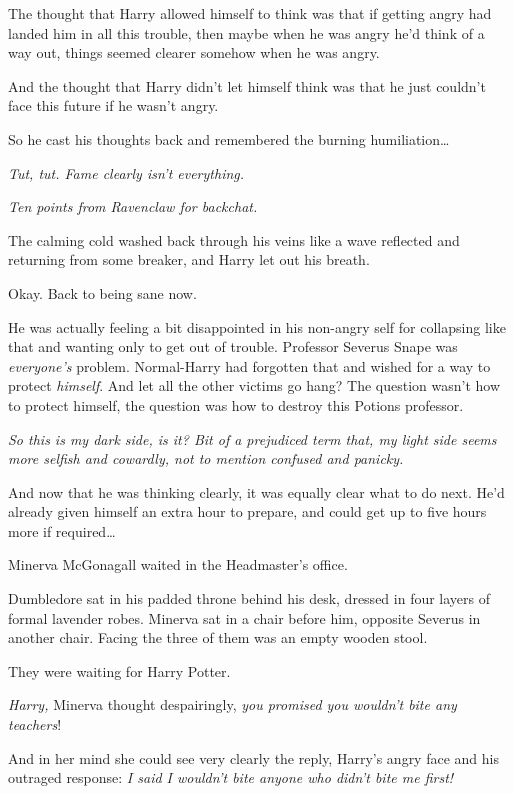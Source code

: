 The thought that Harry allowed himself to think was that if getting angry had landed him in all this trouble, then maybe when he was angry he'd think of a way out, things seemed clearer somehow when he was angry.

And the thought that Harry didn't let himself think was that he just couldn't face this future if he wasn't angry.

So he cast his thoughts back and remembered the burning humiliation{\ldots}

\emph{Tut, tut. Fame clearly isn't everything.}

\emph{Ten points from Ravenclaw for backchat.}

The calming cold washed back through his veins like a wave reflected and returning from some breaker, and Harry let out his breath.

Okay. Back to being sane now.

He was actually feeling a bit disappointed in his non-angry self for collapsing like that and wanting only to get out of trouble. Professor Severus Snape was \emph{everyone's} problem. Normal-Harry had forgotten that and wished for a way to protect \emph{himself}. And let all the other victims go hang? The question wasn't how to protect himself, the question was how to destroy this Potions professor.

\emph{So this is my dark side, is it? Bit of a prejudiced term that, my light side seems more selfish and cowardly, not to mention confused and panicky.}

And now that he was thinking clearly, it was equally clear what to do next. He'd already given himself an extra hour to prepare, and could get up to five hours more if required{\ldots}

\later

Minerva McGonagall waited in the Headmaster's office.

Dumbledore sat in his padded throne behind his desk, dressed in four layers of formal lavender robes. Minerva sat in a chair before him, opposite Severus in another chair. Facing the three of them was an empty wooden stool.

They were waiting for Harry Potter.

\emph{Harry,} Minerva thought despairingly, \emph{you promised you wouldn't bite any teachers}!

And in her mind she could see very clearly the reply, Harry's angry face and his outraged response: \emph{I said I wouldn't bite anyone who didn't bite me first!}

